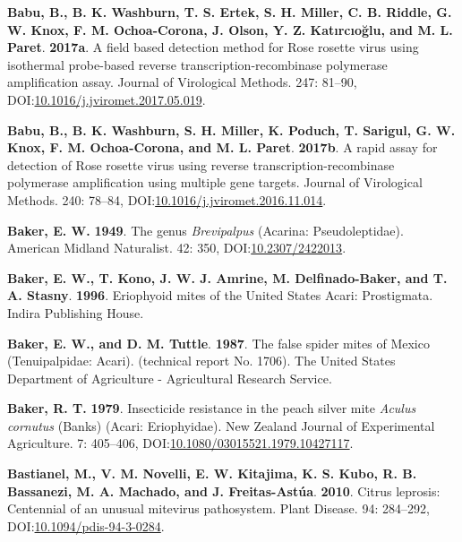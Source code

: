 \documentclass[12pt,final,CPage]{ufthesis}
\newlength{\cslhangindent}
\newenvironment{CSLReferences}[2] %
{%
	\setlength{\parindent}{0pt}
	\ifodd #1 \everypar{\setlength{\hangindent}{\cslhangindent}}\ignorespaces\fi
	\ifnum #2 > 0
	\setlength{\parskip}{#2\baselineskip}
	\fi
}%
{}
\begin{document}
{\begin{CSLReferences}{1}{0}
  \leavevmode{}%
  \textbf{Babu, B., B. K. Washburn, T. S. Ertek, S. H. Miller, C. B. Riddle, G. W. Knox, F. M. Ochoa-Corona, J. Olson, Y. Z. Katırcıoğlu, and M. L. Paret}. \textbf{2017a}. A field based detection method for {Rose rosette virus} using isothermal probe-based reverse transcription-recombinase polymerase amplification assay. Journal of Virological Methods. 247: 81--90, DOI:\href{https://doi.org/10.1016/j.jviromet.2017.05.019}{10.1016/j.jviromet.2017.05.019}.

  \leavevmode{}%
  \textbf{Babu, B., B. K. Washburn, S. H. Miller, K. Poduch, T. Sarigul, G. W. Knox, F. M. Ochoa-Corona, and M. L. Paret}. \textbf{2017b}. A rapid assay for detection of {Rose rosette virus} using reverse transcription-recombinase polymerase amplification using multiple gene targets. Journal of Virological Methods. 240: 78--84, DOI:\href{https://doi.org/10.1016/j.jviromet.2016.11.014}{10.1016/j.jviromet.2016.11.014}.

  \leavevmode{}%
  \textbf{Baker, E. W.} \textbf{1949}. The genus {\emph{Brevipalpus}} ({Acarina}: {Pseudoleptidae}). American Midland Naturalist. 42: 350, DOI:\href{https://doi.org/10.2307/2422013}{10.2307/2422013}.

  \leavevmode{}%
  \textbf{Baker, E. W., T. Kono, J. W. J. Amrine, M. Delfinado-Baker, and T. A. Stasny}. \textbf{1996}. Eriophyoid mites of the {United States} {Acari}: {Prostigmata}. Indira Publishing House.

  \leavevmode{}%
  \textbf{Baker, E. W., and D. M. Tuttle}. \textbf{1987}. The false spider mites of {Mexico} ({Tenuipalpidae}: {Acari}). (technical report No. 1706). The {United States} Department of Agriculture - Agricultural Research Service.

  \leavevmode{}%
  \textbf{Baker, R. T.} \textbf{1979}. Insecticide resistance in the peach silver mite {\emph{Aculus cornutus}} {(Banks)} ({Acari}: {Eriophyidae}). New Zealand Journal of Experimental Agriculture. 7: 405--406, DOI:\href{https://doi.org/10.1080/03015521.1979.10427117}{10.1080/03015521.1979.10427117}.

  \leavevmode{}%
  \textbf{Bastianel, M., V. M. Novelli, E. W. Kitajima, K. S. Kubo, R. B. Bassanezi, M. A. Machado, and J. Freitas-Astúa}. \textbf{2010}. {Citrus leprosis}: Centennial of an unusual mite{\textendash}virus pathosystem. Plant Disease. 94: 284--292, DOI:\href{https://doi.org/10.1094/pdis-94-3-0284}{10.1094/pdis-94-3-0284}.


\end{CSLReferences}}
\end{document}
